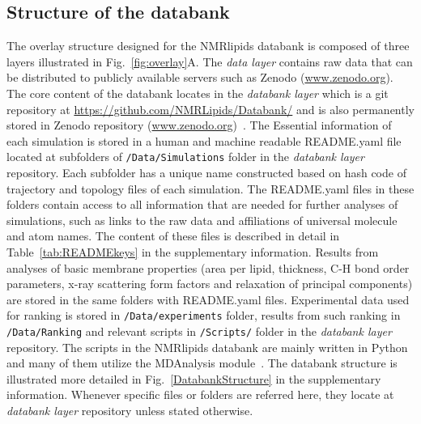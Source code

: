 \documentclass[fleqn,10pt]{wlscirep}
\begin{document}
\subsection{Structure of the databank}
The overlay structure designed for the NMRlipids databank is composed of three layers illustrated in Fig.~\ref{fig:overlay}A. The {\it data layer} contains raw data that can be distributed to publicly available servers such as Zenodo (\url{www.zenodo.org}). The core content of the databank locates in the {\it databank layer} which is a git repository at \url{https://github.com/NMRLipids/Databank/} and is also permanently stored in Zenodo repository (\url{www.zenodo.org})~\cite{??}. The Essential information of each simulation is stored in a human and machine readable README.yaml file located at subfolders of \texttt{/Data/Simulations} folder in the {\it databank layer} repository. Each subfolder has a unique name constructed based on hash code of trajectory and topology files of each simulation. The README.yaml files in these folders contain access to all information that are needed for further analyses of simulations, such as links to the raw data and affiliations of universal molecule and atom names. The content of these files is described in detail in Table~\ref{tab:READMEkeys} in the supplementary information. Results from analyses of basic membrane properties (area per lipid, thickness, C-H bond order parameters, x-ray scattering form factors and relaxation of principal components) are stored in the same folders with README.yaml files. Experimental data used for ranking is stored in \texttt{/Data/experiments} folder, results from such ranking in \texttt{/Data/Ranking} and  relevant scripts in \texttt{/Scripts/} folder in the {\it databank layer} repository. 
The scripts in the NMRlipids databank are mainly written in Python and many of them utilize the MDAnalysis module~\cite{gowers2019mdanalysis,michaud2011mdanalysis}. The databank structure is illustrated more detailed in Fig.~\ref{DatabankStructure} in the supplementary information. Whenever specific files or folders are referred here, they locate at {\it databank layer} repository unless stated otherwise. 
\end{document}
